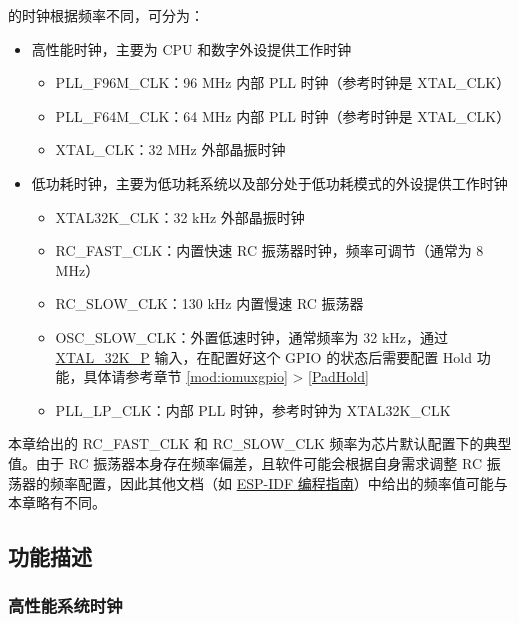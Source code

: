 \documentclass[main\_\_CN.tex]{subfiles}
\begin{document}
\chipname{} 的时钟根据频率不同，可分为：
\begin{itemize}
    \item 高性能时钟，主要为 CPU 和数字外设提供工作时钟
    \begin{itemize}
        \item PLL\_F96M\_CLK：96 MHz 内部 PLL 时钟（参考时钟是 XTAL\_CLK）
        \item PLL\_F64M\_CLK：64 MHz 内部 PLL 时钟（参考时钟是 XTAL\_CLK）
        \item XTAL\_CLK：32 MHz 外部晶振时钟
    \end{itemize}
    \item 低功耗时钟，主要为低功耗系统以及部分处于低功耗模式的外设提供工作时钟
    \begin{itemize}
        \item XTAL32K\_CLK：32 kHz 外部晶振时钟
	    \item RC\_FAST\_CLK：内置快速 RC 振荡器时钟，频率可调节（通常为 8 MHz）
	    \item RC\_SLOW\_CLK：130 kHz 内置慢速 RC 振荡器
	    \item OSC\_SLOW\_CLK：外置低速时钟，通常频率为 32 kHz，通过 \hyperref[tab:iomuxgpio-iomax-pins-analog-functions]{XTAL\_32K\_P} 输入，在配置好这个 GPIO 的状态后需要配置 Hold 功能，具体请参考章节 \ref{mod:iomuxgpio} \textit{} >  \ref{PadHold} \textit{}
        \item PLL\_LP\_CLK：内部 PLL 时钟，参考时钟为 XTAL32K\_CLK
    \end{itemize}
\end{itemize}

\begin{tiplisting}
本章给出的 RC\_FAST\_CLK 和 RC\_SLOW\_CLK 频率为芯片默认配置下的典型值。由于 RC 振荡器本身存在频率偏差，且软件可能会根据自身需求调整 RC 振荡器的频率配置，因此其他文档（如 \href{https://docs.espressif.com/projects/esp-idf/zh_CN/latest/esp32h2/api-reference/peripherals/clk_tree.html}{ESP-IDF 编程指南}）中给出的频率值可能与本章略有不同。
\end{tiplisting}

\subsection{功能描述}

\subsubsection{高性能系统时钟}
\end{document}
